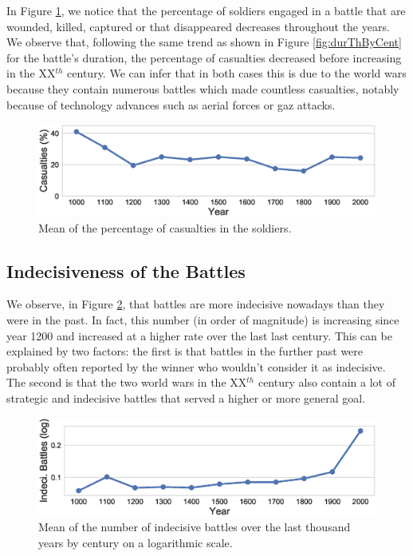 In Figure \ref{fig:casuPerCent}, we notice that the percentage of soldiers engaged in a battle that are wounded, killed, captured or that disappeared decreases throughout the years. We observe that, following the same trend as shown in Figure \ref{fig:durThByCent} for the battle's duration, the percentage of casualties decreased before increasing in the XX$^{th}$ century. We can infer that in both cases this is due to the world wars because they contain numerous battles which made countless casualties, notably because of technology advances such as aerial forces or gaz attacks.
 \begin{figure}[h]
	\centering	\includegraphics[width=\linewidth]{figures/casuPerCent}
	\caption{Mean of the percentage of casualties in the soldiers.}\label{fig:casuPerCent}
	\centering
\end{figure}

\subsection{Indecisiveness of the Battles}

We observe, in Figure \ref{fig:IndecBattles}, that battles are more indecisive nowadays than they were in the past. In fact, this number (in order of magnitude) is increasing since year 1200 and increased at a higher rate over the last last century. This can be explained by two factors: the first is that battles in the further past were probably often reported by the winner who wouldn't consider it as indecisive. The second is that the two world wars in the  XX$^{th}$ century also contain a lot of strategic and indecisive battles that served a higher or more general goal.
 \begin{figure}[h]
	\centering	\includegraphics[width=\linewidth]{figures/indThByCent}
	\caption{Mean of the number of indecisive battles over the last thousand years by century on a logarithmic scale.}\label{fig:IndecBattles}
	\centering
\end{figure}

